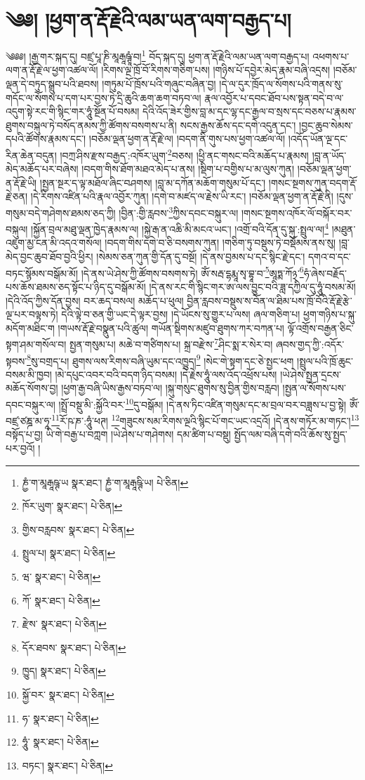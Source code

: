 \setcounter{footnote}{0} 
\chapter{༄༅། །ཕྱག་ན་རྡོ་རྗེའི་ལམ་ཡན་ལག་བརྒྱད་པ།}༄༅༅། །རྒྱ་གར་སྐད་དུ། བཛྲ་པཱ་ཎི་མཱརྒཱཥྚཱཾ་བ།\footnote{ཎྱཾ་ག་མཱརྒཱཥྚ་ཡ  སྣར་ཐང་། ཎྱཾ་ག་མཱརྒཱཥྚི་ཡ།  པེ་ཅིན། } བོད་སྐད་དུ། ཕྱག་ན་རྡོ་རྗེའི་ལམ་ཡན་ལག་བརྒྱད་པ། འཕགས་པ་ལག་ན་རྡོ་རྗེ་ལ་ཕྱག་འཚལ་ལོ། །རིགས་ལྔ་ཁྲོ་བོ་རིགས་གཅིག་པས། །གཉིས་པོ་དབྱེར་མེད་རྣམ་བཞི་འདྲས། །བཅོམ་ལྡན་དེ་བཏུད་སྒྲུབ་པའི་ཐབས། །གཏུམ་པོ་ཁྲོས་པའི་གཞུང་བཞིན་བྱ། །དེ་ལ་དུར་ཁྲོད་ལ་སོགས་པའི་གནས་སུ་གདོང་ལ་སོགས་པ་དག་པར་བྱས་ཏེ་དྲི་ཆུའི་ཆག་ཆག་བཏབ་ལ། རྣལ་འབྱོར་པ་དབང་ཐོབ་པས་སྟན་བདེ་བ་ལ་འདུག་སྟེ་རང་གི་སྙིང་གར་ཧཱུཾ་སྔོན་པོ་བསམ། དེའི་འོད་ཟེར་གྱིས་བླ་མ་དང་ལྷ་དང་རྒྱལ་བ་སྲས་དང་བཅས་པ་རྣམས་ཐུགས་བསྐུལ་ཏེ་བསོད་ནམས་ཀྱི་ཚོགས་བསགས་པ་ནི། སངས་རྒྱས་ཆོས་དང་དགེ་འདུན་དང་། །བྱང་ཆུབ་སེམས་དཔའི་ཚོགས་རྣམས་དང་། །བཅོམ་ལྡན་ཕྱག་ན་རྡོ་རྗེ་ལ། །བདག་ནི་གུས་པས་ཕྱག་འཚལ་ལོ། །འདོད་ཡོན་ལྔ་དང་རིན་ཆེན་བདུན། །བཀྲ་ཤིས་རྫས་བརྒྱད་:འཁོར་ཡུག་\footnote{ཁོར་ཡུག་  སྣར་ཐང་།  པེ་ཅིན། }བཅས། །ཕྱི་ནང་གསང་བའི་མཆོད་པ་རྣམས། །བླ་ན་ཡོད་མེད་མཆོད་པར་བཞེས། །བདག་གིས་ཐོག་མཐའ་མེད་པ་ནས། །སྡིག་པ་བགྱིས་པ་མ་ལུས་ཀུན། །བཅོམ་ལྡན་ཕྱག་ན་རྡོ་རྗེ་ཡི། །སྤྱན་སྔར་ད་ལྟ་མཐོལ་ཞིང་བཤགས། །བླ་མ་དཀོན་མཆོག་གསུམ་པོ་དང་། །གསང་སྔགས་ཀུན་བདག་རྡོ་རྗེ་ཅན། །དེ་རིགས་འཛིན་པའི་རྣལ་འབྱོར་ཀུན། །དགེ་བ་མཛད་ལ་རྗེས་ཡི་རང་། །བཅོམ་ལྡན་ཕྱག་ན་རྡོ་རྗེ་ནི། །དུས་གསུམ་བདེ་གཤེགས་ཐམས་ཅད་ཀྱི། །བྱིན་:གྱི་རླབས་\footnote{གྱིས་བརླབས་  སྣར་ཐང་།  པེ་ཅིན། }ཀྱིས་དབང་བསྐུར་ལ། །གསང་སྔགས་འཁོར་ལོ་བསྐོར་བར་བསྐུལ། །སྐྱོན་བྲལ་མཐུ་ལྡན་ཁྱེད་རྣམས་ལ། །སྐྱེ་རྒ་ན་འཆི་མི་མངའ་ཡང་། །འགྲོ་བའི་དོན་དུ་སྐུ་:སྤྲུལ་ལ།\footnote{སྤྲུལ་པ།  སྣར་ཐང་།  པེ་ཅིན། } །མཐུན་འཇུག་མྱ་ངན་མི་འདའ་གསོལ། །བདག་གིས་དགེ་བ་ཅི་བསགས་ཀུན། །གཅིག་ཏུ་བསྡུས་ཏེ་བསྡོམས་ནས་སུ། །བླ་མེད་བྱང་ཆུབ་ཐོབ་བྱའི་ཕྱིར། །སེམས་ཅན་ཀུན་གྱི་དོན་དུ་བསྔོ། །དེ་ནས་བྱམས་པ་དང་སྙིང་རྗེ་དང་། དགའ་བ་དང་བཏང་སྙོམས་བསྒོམ་མོ། །དེ་ནས་ཡེ་ཤེས་ཀྱི་ཚོགས་བསགས་ཏེ། ཨོཾ་སརྦ་དྷརྨཱ་སྭ་བྷཱ་བ་\footnote{ཝ་  སྣར་ཐང་།  པེ་ཅིན། }ཨཱཏྨ་ཀོ྅་\footnote{ཀོ་  སྣར་ཐང་།  པེ་ཅིན། }ཧཾ་ཞེས་བརྗོད་པས་ཆོས་ཐམས་ཅད་སྟོང་པ་ཉིད་དུ་བསྒོམ་མོ། །དེ་ནས་རང་གི་སྙིང་གར་ཨ་ལས་བྱུང་བའི་ཟླ་དཀྱིལ་དུ་ཧཱུཾ་བསམ་མོ། །དེའི་འོད་ཀྱིས་དོན་བྱས། བར་ཆད་བསལ། མཆོད་པ་ཕུལ། བྱིན་རླབས་བསྡུས་ས་བོན་ལ་ཐིམ་པས་ཁྲོ་བོའི་རྡོ་རྗེ་རྩེ་ལྔ་པར་བལྟས་ཏེ། དེའི་ལྟེ་བ་ཅན་གྱི་ཡང་དེ་ལྟར་བྱས། །དེ་ཡོངས་སུ་གྱུར་པ་ལས། ཞལ་གཅིག་པ། ཕྱག་གཉིས་པ་སྐུ་མདོག་མཐིང་ག །གཡས་རྡོ་རྗེ་བསྣུན་པའི་ཚུལ། གཡོན་སྡིགས་མཛུབ་ཐུགས་ཀར་བཀན་པ། ལྟོ་འགྲོས་བརྒྱན་ཅིང་སྟག་ཤམ་གསོལ་བ། སྤྱན་གསུམ་པ། མཆེ་བ་གཙིགས་པ། སྐྲ་བརྫེས་\footnote{རྫེས་  སྣར་ཐང་།  པེ་ཅིན། }ཤིང་སྨ་ར་སེར་བ། ཞབས་གྱད་ཀྱི་:འདོར་སྟབས་\footnote{དོར་ཐབས་  སྣར་ཐང་།  པེ་ཅིན། }སུ་བགྲད་པ། ཐུགས་ལས་རིགས་བཞི་ཡུམ་དང་འཁྱུད།\footnote{ཁྱུད།  སྣར་ཐང་།  པེ་ཅིན། } །སེང་གེ་སྟག་དང་ཅེ་སྤྱང་ཕག །སྤྲུལ་པའི་ཁྲོ་ཆུང་བསམ་མི་ཁྱབ། །མེ་དཔུང་འབར་བའི་བདག་ཉིད་བསམ། །དེ་རྗེས་ཧཱུཾ་ལས་འོད་འཕྲོས་པས། །ཡེ་ཤེས་སྤྱན་དྲངས་མཆོད་སོགས་བྱ། །ཕྱག་རྒྱ་བཞི་ཡིས་རྒྱས་བཏབ་ལ། །སྐུ་གསུང་ཐུགས་སུ་བྱིན་གྱིས་བརླབ། །སྤྱན་ལ་སོགས་པས་དབང་བསྐུར་ལ། །སྤྲོ་བསྡུ་མི་:སྐྱོའི་བར་\footnote{སྐྱོ་བར་  སྣར་ཐང་།  པེ་ཅིན། }དུ་བསྒོམ། །དེ་ནས་ཏིང་འཛིན་གསུམ་དང་མ་བྲལ་བར་བཟླས་པ་བྱ་སྟེ། ཨོཾ་བཛྲ་ཙཎྜ་མ་ཧཱ་\footnote{ཧ་  སྣར་ཐང་།  པེ་ཅིན། }རོ་ཥ་ཎ་:ཧཱུཾ་ཕཊ། \footnote{ཧཱུཾ་  སྣར་ཐང་།  པེ་ཅིན། }གཟུངས་སམ་རིགས་ལྔའི་སྙིང་པོ་གང་ཡང་འདྲའོ། །དེ་ནས་གཏོར་མ་གཏང་།\footnote{བཏང་།  སྣར་ཐང་།  པེ་ཅིན། } བསྟོད་པ་བྱ། ཡི་གེ་བརྒྱ་པ་བཀླག །ཡེ་ཤེས་པ་གཤེགས། དམ་ཚིག་པ་བསྡུ། སྤྱོད་ལམ་བཞི་དགེ་བའི་ཆོས་སུ་སྤྱད་པར་བྱའོ། །
